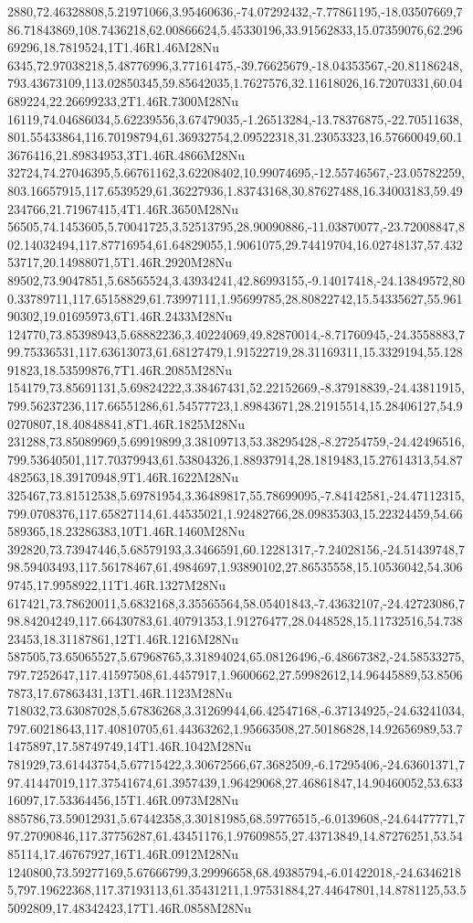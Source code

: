 2880,72.46328808,5.21971066,3.95460636,-74.07292432,-7.77861195,-18.03507669,786.71843869,108.7436218,62.00866624,5.45330196,33.91562833,15.07359076,62.29669296,18.7819524,1T1.46R1.46M28Nu
6345,72.97038218,5.48776996,3.77161475,-39.76625679,-18.04353567,-20.81186248,793.43673109,113.02850345,59.85642035,1.7627576,32.11618026,16.72070331,60.04689224,22.26699233,2T1.46R.7300M28Nu
16119,74.04686034,5.62239556,3.67479035,-1.26513284,-13.78376875,-22.70511638,801.55433864,116.70198794,61.36932754,2.09522318,31.23053323,16.57660049,60.13676416,21.89834953,3T1.46R.4866M28Nu
32724,74.27046395,5.66761162,3.62208402,10.99074695,-12.55746567,-23.05782259,803.16657915,117.6539529,61.36227936,1.83743168,30.87627488,16.34003183,59.49234766,21.71967415,4T1.46R.3650M28Nu
56505,74.1453605,5.70041725,3.52513795,28.90090886,-11.03870077,-23.72008847,802.14032494,117.87716954,61.64829055,1.9061075,29.74419704,16.02748137,57.43253717,20.14988071,5T1.46R.2920M28Nu
89502,73.9047851,5.68565524,3.43934241,42.86993155,-9.14017418,-24.13849572,800.33789711,117.65158829,61.73997111,1.95699785,28.80822742,15.54335627,55.96190302,19.01695973,6T1.46R.2433M28Nu
124770,73.85398943,5.68882236,3.40224069,49.82870014,-8.71760945,-24.3558883,799.75336531,117.63613073,61.68127479,1.91522719,28.31169311,15.3329194,55.12891823,18.53599876,7T1.46R.2085M28Nu
154179,73.85691131,5.69824222,3.38467431,52.22152669,-8.37918839,-24.43811915,799.56237236,117.66551286,61.54577723,1.89843671,28.21915514,15.28406127,54.90270807,18.40848841,8T1.46R.1825M28Nu
231288,73.85089969,5.69919899,3.38109713,53.38295428,-8.27254759,-24.42496516,799.53640501,117.70379943,61.53804326,1.88937914,28.1819483,15.27614313,54.87482563,18.39170948,9T1.46R.1622M28Nu
325467,73.81512538,5.69781954,3.36489817,55.78699095,-7.84142581,-24.47112315,799.0708376,117.65827114,61.44535021,1.92482766,28.09835303,15.22324459,54.66589365,18.23286383,10T1.46R.1460M28Nu
392820,73.73947446,5.68579193,3.3466591,60.12281317,-7.24028156,-24.51439748,798.59403493,117.56178467,61.4984697,1.93890102,27.86535558,15.10536042,54.3069745,17.9958922,11T1.46R.1327M28Nu
617421,73.78620011,5.6832168,3.35565564,58.05401843,-7.43632107,-24.42723086,798.84204249,117.66430783,61.40791353,1.91276477,28.0448528,15.11732516,54.73823453,18.31187861,12T1.46R.1216M28Nu
587505,73.65065527,5.67968765,3.31894024,65.08126496,-6.48667382,-24.58533275,797.7252647,117.41597508,61.4457917,1.9600662,27.59982612,14.96445889,53.85067873,17.67863431,13T1.46R.1123M28Nu
718032,73.63087028,5.67836268,3.31269944,66.42547168,-6.37134925,-24.63241034,797.60218643,117.40810705,61.44363262,1.95663508,27.50186828,14.92656989,53.71475897,17.58749749,14T1.46R.1042M28Nu
781929,73.61443754,5.67715422,3.30672566,67.3682509,-6.17295406,-24.63601371,797.41447019,117.37541674,61.3957439,1.96429068,27.46861847,14.90460052,53.63316097,17.53364456,15T1.46R.0973M28Nu
885786,73.59012931,5.67442358,3.30181985,68.59776515,-6.0139608,-24.64477771,797.27090846,117.37756287,61.43451176,1.97609855,27.43713849,14.87276251,53.5485114,17.46767927,16T1.46R.0912M28Nu
1240800,73.59277169,5.67666799,3.29996658,68.49385794,-6.01422018,-24.63462185,797.19622368,117.37193113,61.35431211,1.97531884,27.44647801,14.8781125,53.55092809,17.48342423,17T1.46R.0858M28Nu
